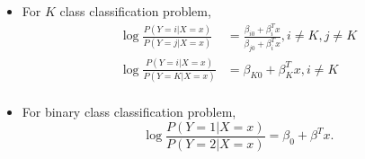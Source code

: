 \begin{refsection}
\begin{remark}\hfill
\begin{itemize}
	\item For $K$ class classification problem,
	\begin{align*}
	\log \frac{P(Y = i|X=x)}{P(Y = j|X=x)} &= \frac{\beta_{i0} + \beta_i^Tx}{\beta_{j0} + \beta_i^Tx}, i\neq K, j\neq K \\
	\log \frac{P(Y = i|X=x)}{P(Y = K|X=x)} &= \beta_{K0} + \beta_K^Tx, i\neq K \\
	\end{align*}
	\item For binary class classification problem,
	$$\log \frac{P(Y = 1|X=x)}{P(Y = 2|X=x)} = \beta_{0} + \beta^Tx.$$
\end{itemize}	
\end{remark}



\end{refsection}
